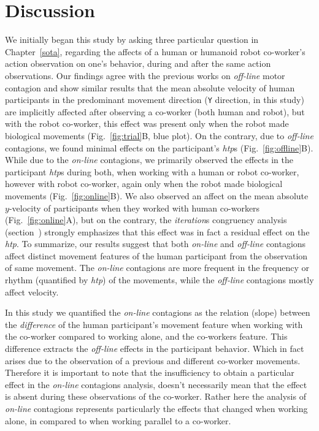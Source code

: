 
\section{Discussion}


We initially began this study by asking three particular question in Chapter~\ref{sota}, regarding the affects of a human or humanoid robot co-worker's action observation on one's behavior, during and after the same action observations. Our findings agree with the previous works on \textit{off-line} motor contagion and show similar results that the mean absolute velocity of human participants in the predominant movement direction (\texttt{Y} direction, in this study) are implicitly affected after observing a co-worker (both human and robot), but with the robot co-worker, this effect was present only when the robot made biological movements (Fig.~\ref{fig:trial}B, blue plot). On the contrary, due to \textit{off-line} contagions, we found minimal effects on the participant's {\it htp}s (Fig.~\ref{fig:offline}B). While due to the \textit{on-line} contagions, we primarily observed the effects in the participant {\it htp}s during both, when working with a human or robot co-worker, however with robot co-worker, again only when the robot made biological movements (Fig.~\ref{fig:online}B). We also observed an affect on the mean absolute $y$-velocity of participants when they worked with human co-workers (Fig.~\ref{fig:online}A), but on the contrary, the \textit{iteration}s congruency analysis (section~) strongly emphasizes that this effect was in fact a residual effect on the {\it htp}. To summarize, our results suggest that both \textit{on-line} and \textit{off-line} contagions affect distinct movement features of the human participant from the observation of same movement. The \textit{on-line} contagions are more frequent in the frequency or rhythm (quantified by {\it htp}) of the movements, while the \textit{off-line} contagions mostly affect velocity.

In this study we quantified the \textit{on-line} contagions as the relation (slope) between the \textit{difference} of the human participant's movement feature when working with the co-worker compared to working alone, and the co-workers feature. This difference extracts the \textit{off-line} effects in the participant behavior. Which in fact arises due to the observation of a previous and different co-worker movements. Therefore it is important to note that the insufficiency to obtain a particular effect in the \textit{on-line} contagions analysis, doesn't necessarily mean that the effect is absent during these observations of the co-worker. Rather here the analysis of \textit{on-line} contagions represents particularly the effects that changed when working alone, in compared to when working parallel to a co-worker.

